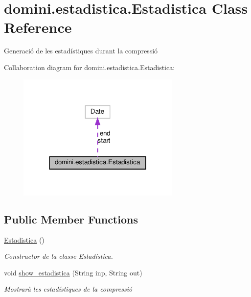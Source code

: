 \hypertarget{classdomini_1_1estadistica_1_1Estadistica}{}\section{domini.\+estadistica.\+Estadistica Class Reference}
\label{classdomini_1_1estadistica_1_1Estadistica}


Generació de les estadístiques durant la compressió  




Collaboration diagram for domini.\+estadistica.\+Estadistica\+:\nopagebreak
\begin{figure}[H]
\begin{center}
\leavevmode
\includegraphics[width=227pt]{classdomini_1_1estadistica_1_1Estadistica__coll__graph}
\end{center}
\end{figure}
\subsection*{Public Member Functions}
\begin{DoxyCompactItemize}
\item 
\hyperlink{classdomini_1_1estadistica_1_1Estadistica_a16c37d85709413fd65f8dee111faed49}{Estadistica} ()
\begin{DoxyCompactList}\small\item\em Constructor de la classe Estadística. \end{DoxyCompactList}\item 
void \hyperlink{classdomini_1_1estadistica_1_1Estadistica_a6cac6971be817fd985afb8f3b6725464}{show\+\_\+estadistica} (String inp, String out)
\begin{DoxyCompactList}\small\item\em Mostrarà les estadístiques de la compressió \end{DoxyCompactList}\end{DoxyCompactItemize}


